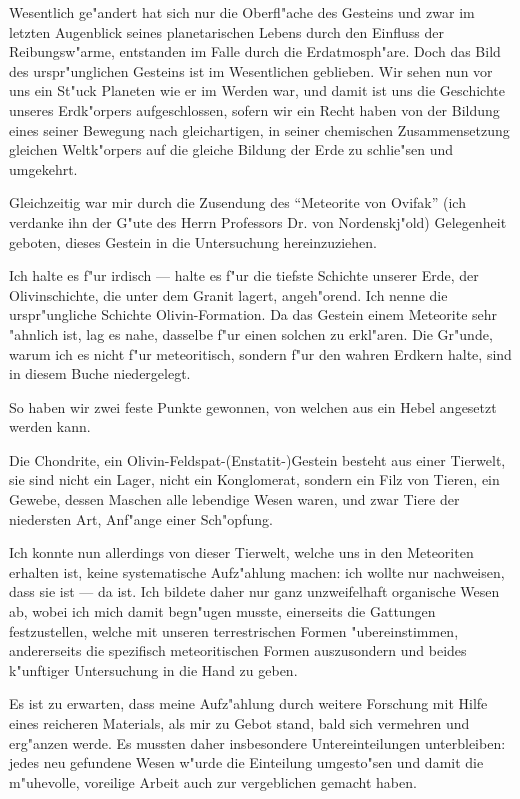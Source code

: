 \documentclass[a4paper, 11pt, oneside]{article}
\begin{document}
Wesentlich ge"andert hat sich nur die Oberfl"ache des Gesteins und zwar im letzten Augenblick seines planetarischen Lebens durch den Einfluss der Reibungsw"arme, entstanden im Falle durch die Erdatmosph"are. Doch das Bild des urspr"unglichen Gesteins ist im Wesentlichen geblieben. Wir sehen nun vor uns ein St"uck Planeten wie er im Werden war, und damit ist uns die Geschichte unseres Erdk"orpers aufgeschlossen, sofern wir ein Recht haben von der Bildung eines seiner Bewegung nach gleichartigen, in seiner chemischen Zusammensetzung gleichen Weltk"orpers auf die gleiche Bildung der Erde zu schlie"sen und umgekehrt.

Gleichzeitig war mir durch die Zusendung des "`Meteorite von Ovifak"' (ich verdanke ihn der G"ute des Herrn Professors Dr. von Nordenskj"old) Gelegenheit geboten, dieses Gestein in die Untersuchung hereinzuziehen.

Ich halte es f"ur irdisch --- halte es f"ur die tiefste Schichte unserer Erde, der Olivinschichte, die unter dem Granit lagert, angeh"orend. Ich nenne die urspr"ungliche Schichte Olivin-Formation. Da das Gestein einem Meteorite sehr "ahnlich ist, lag es nahe, dasselbe f"ur einen solchen zu erkl"aren. Die Gr"unde, warum ich es nicht f"ur meteoritisch, sondern f"ur den wahren Erdkern halte, sind in diesem Buche niedergelegt.

So haben wir zwei feste Punkte gewonnen, von welchen aus ein Hebel angesetzt werden kann.

Die Chondrite, ein Olivin-Feldspat-(Enstatit-)Gestein besteht aus einer Tierwelt, sie sind nicht ein Lager, nicht ein Konglomerat, sondern ein Filz von Tieren, ein Gewebe, dessen Maschen alle lebendige Wesen waren, und zwar Tiere der niedersten Art, Anf"ange einer Sch"opfung.

Ich konnte nun allerdings von dieser Tierwelt, welche uns in den Meteoriten erhalten ist, keine systematische Aufz"ahlung machen: ich wollte nur nachweisen, dass sie ist --- da ist. Ich bildete daher nur ganz unzweifelhaft organische Wesen ab, wobei ich mich damit begn"ugen musste, einerseits die Gattungen festzustellen, welche mit unseren terrestrischen Formen "ubereinstimmen, andererseits die spezifisch meteoritischen Formen auszusondern und beides k"unftiger Untersuchung in die Hand zu geben.

Es ist zu erwarten, dass meine Aufz"ahlung durch weitere Forschung mit Hilfe eines reicheren Materials, als mir zu Gebot stand, bald sich vermehren und erg"anzen werde. Es mussten daher insbesondere Untereinteilungen unterbleiben: jedes neu gefundene Wesen w"urde die Einteilung umgesto"sen und damit die m"uhevolle, voreilige Arbeit auch zur vergeblichen gemacht haben.
\end{document}

